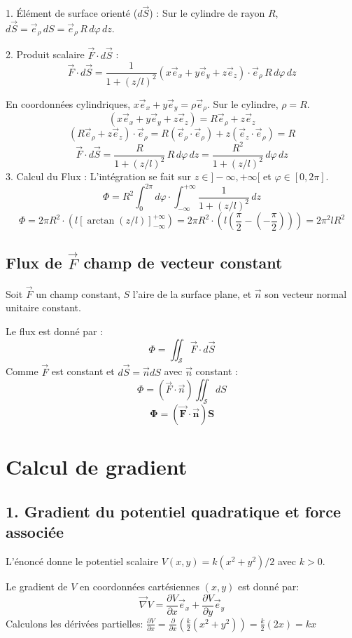 \documentclass[french]{yLectureNote}
\renewcommand{\vec}{\overrightarrow}
\begin{document}
1.  Élément de surface orienté ($d\vec{S}$) : Sur le cylindre de rayon $R$, $d\vec{S} = \vec{e}_\rho \, dS = \vec{e}_\rho \, R \, d\varphi \, dz$.

2.  Produit scalaire $\vec{F} \cdot d\vec{S}$ :
    $$\vec{F} \cdot d\vec{S} = \frac{1}{1+(z/l)^{2}} (x\vec{e}_{x}+y\vec{e}_{y}+z\vec{e}_{z}) \cdot \vec{e}_\rho \, R \, d\varphi \, dz$$

    En coordonnées cylindriques, $x\vec{e}_{x}+y\vec{e}_{y} = \rho \vec{e}_\rho$. Sur le cylindre, $\rho=R$.
    $$(x\vec{e}_{x}+y\vec{e}_{y}+z\vec{e}_{z}) = R\vec{e}_{\rho} + z\vec{e}_{z}$$
    $$(R\vec{e}_{\rho} + z\vec{e}_{z}) \cdot \vec{e}_\rho = R(\vec{e}_{\rho}\cdot\vec{e}_{\rho}) + z(\vec{e}_{z}\cdot\vec{e}_{\rho}) = R$$
    $$\vec{F} \cdot d\vec{S} = \frac{R}{1+(z/l)^{2}} \, R \, d\varphi \, dz = \frac{R^2}{1+(z/l)^{2}} \, d\varphi \, dz$$
3.  Calcul du Flux : L'intégration se fait sur $z \in ]-\infty, +\infty[$ et $\varphi \in [0, 2\pi]$.
    $$\Phi = R^2 \int_{0}^{2\pi} d\varphi \cdot \int_{-\infty}^{+\infty} \frac{1}{1+(z/l)^{2}} \, dz$$
    $$\Phi = 2\pi R^2 \cdot (l [\arctan(z/l)]_{-\infty}^{+\infty}) = 2\pi R^2 \cdot (l (\frac{\pi}{2} - (-\frac{\pi}{2}))) =  2\pi^2 l R^2$$
\subsection{Flux de $\vec{F}$ champ de vecteur constant}

Soit $\vec{F}$ un champ constant, $S$ l'aire de la surface plane, et $\vec{n}$ son vecteur normal unitaire constant.

Le flux est donné par :
$$\Phi = \iint_{\mathcal{S}} \vec{F} \cdot d\vec{S}$$
Comme $\vec{F}$ est constant et $d\vec{S} = \vec{n} dS$ avec $\vec{n}$ constant :
$$\Phi = (\vec{F} \cdot \vec{n}) \iint_{\mathcal{S}} dS$$
$$\mathbf{\Phi = (\vec{F} \cdot \vec{n}) S}$$
\section{Calcul de gradient}
\subsection{1. Gradient du potentiel quadratique et force associée}

L'énoncé donne le potentiel scalaire $V(x,y)=k(x^{2}+y^{2})/2$ avec $k>0$.

Le gradient de $V$ en coordonnées cartésiennes $(x,y)$ est donné par:
$$
\vec{\nabla}V = \frac{\partial V}{\partial x}\vec{e}_{x} + \frac{\partial V}{\partial y}\vec{e}_{y}
$$
Calculons les dérivées partielles:
$\frac{\partial V}{\partial x} = \frac{\partial}{\partial x} \left( \frac{k}{2}(x^{2}+y^{2}) \right) = \frac{k}{2}(2x) = kx$
\end{document}
